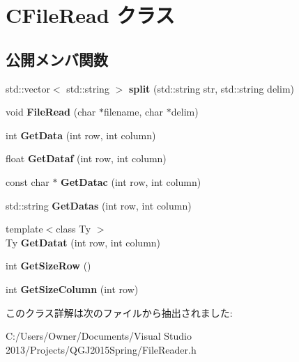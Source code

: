 \hypertarget{class_c_file_read}{}\section{C\+File\+Read クラス}
\label{class_c_file_read}
\subsection*{公開メンバ関数}
\begin{DoxyCompactItemize}
\item 
std\+::vector$<$ std\+::string $>$ {\bfseries split} (std\+::string str, std\+::string delim)\hypertarget{class_c_file_read_ace35bbe6cff05a0d186cf3ec8874af5c}{}\label{class_c_file_read_ace35bbe6cff05a0d186cf3ec8874af5c}

\item 
void {\bfseries File\+Read} (char $\ast$filename, char $\ast$delim)\hypertarget{class_c_file_read_a458bbbb3bd7f00d3d5ad06438d3d35a9}{}\label{class_c_file_read_a458bbbb3bd7f00d3d5ad06438d3d35a9}

\item 
int {\bfseries Get\+Data} (int row, int column)\hypertarget{class_c_file_read_a782ae9f162c099a1216238bd38a9275c}{}\label{class_c_file_read_a782ae9f162c099a1216238bd38a9275c}

\item 
float {\bfseries Get\+Dataf} (int row, int column)\hypertarget{class_c_file_read_a7e0b8c366d8dbe0230f3d2afd1d476f4}{}\label{class_c_file_read_a7e0b8c366d8dbe0230f3d2afd1d476f4}

\item 
const char $\ast$ {\bfseries Get\+Datac} (int row, int column)\hypertarget{class_c_file_read_a1d4b4c1ca8d670672a44fd86c216061a}{}\label{class_c_file_read_a1d4b4c1ca8d670672a44fd86c216061a}

\item 
std\+::string {\bfseries Get\+Datas} (int row, int column)\hypertarget{class_c_file_read_a5957598828bc29d9fabab5e9c6bf1998}{}\label{class_c_file_read_a5957598828bc29d9fabab5e9c6bf1998}

\item 
{\footnotesize template$<$class Ty $>$ }\\Ty {\bfseries Get\+Datat} (int row, int column)\hypertarget{class_c_file_read_a8b2ae8d22c7e59aa7b31abb68e33aedb}{}\label{class_c_file_read_a8b2ae8d22c7e59aa7b31abb68e33aedb}

\item 
int {\bfseries Get\+Size\+Row} ()\hypertarget{class_c_file_read_a5660befac4fbfc77da95a97267f6fa1b}{}\label{class_c_file_read_a5660befac4fbfc77da95a97267f6fa1b}

\item 
int {\bfseries Get\+Size\+Column} (int row)\hypertarget{class_c_file_read_a6aab3743f45c669065fbfe18d03a6004}{}\label{class_c_file_read_a6aab3743f45c669065fbfe18d03a6004}

\end{DoxyCompactItemize}


このクラス詳解は次のファイルから抽出されました\+:\begin{DoxyCompactItemize}
\item 
C\+:/\+Users/\+Owner/\+Documents/\+Visual Studio 2013/\+Projects/\+Q\+G\+J2015\+Spring/File\+Reader.\+h\end{DoxyCompactItemize}
